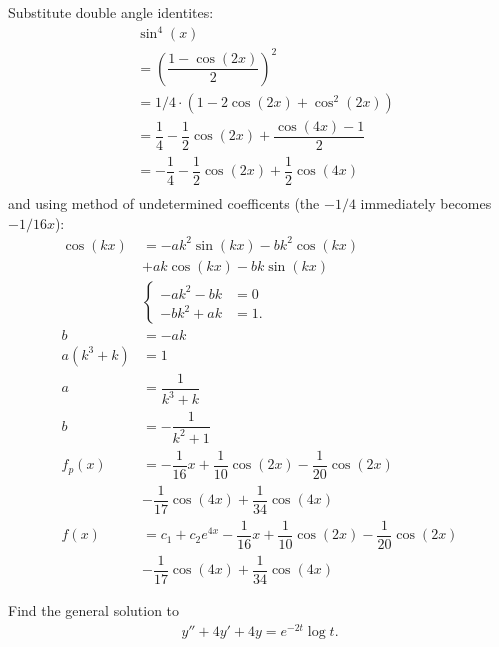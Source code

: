 \documentclass[11pt]{article}
\begin{document}
        \begin{solution}
            Substitute double angle identites:
            \begin{align}
                & \sin^4(x) \\ 
                &= \left(\dfrac{1-\cos(2x)}{2}\right)^2 \\
                &= 1/4 \cdot \left(1-2\cos(2x)+\cos^2(2x)\right) \\
                &= \dfrac{1}{4} - \dfrac{1}{2} \cos(2x) + \dfrac{\cos(4x)-1}{2} \\
                &= - \dfrac{1}{4} - \dfrac{1}{2} \cos(2x) + \dfrac{1}{2} \cos(4x) \\
            \end{align}
            and using method of undetermined coefficents (the $-1/4$ immediately becomes $-1/16 x$):
            \begin{align}
                \cos(kx) &= -ak^2 \sin(kx) - bk^2\cos(kx) \\
                 &+ ak\cos(kx) - bk\sin(kx)   \\
                &\begin{cases}
                    -ak^2 - bk &= 0 \\ 
                    -bk^2 + ak &= 1.
                \end{cases} \\ 
                b &= -ak \\
                a(k^3+k) &= 1 \\
                a &= \dfrac{1}{k^3 + k} \\
                b &= -\dfrac{1}{k^2 + 1} \\
                f_p(x) &= -\dfrac{1}{16}x + \dfrac{1}{10}\cos(2x) - \dfrac{1}{20}\cos(2x) \\
                &- \dfrac{1}{17}\cos(4x) + \dfrac{1}{34}\cos(4x) \\ 
                f(x) &= c_1 + c_2e^{4x}-\dfrac{1}{16}x + \dfrac{1}{10}\cos(2x) - \dfrac{1}{20}\cos(2x) \\
                &- \dfrac{1}{17}\cos(4x) + \dfrac{1}{34}\cos(4x)
            \end{align}
        \end{solution}
        \begin{problem}[Problem 3]
            Find the general solution to 
            \begin{align}
                y'' + 4y' + 4y = e^{-2t} \log t.
            \end{align}
        \end{problem}
\end{document}
